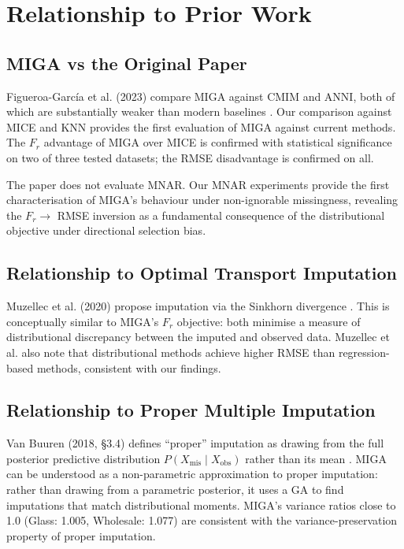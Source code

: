 \section{Relationship to Prior Work}

\subsection{MIGA vs the Original Paper}

Figueroa-Garc\'ia et al. (2023) compare MIGA against CMIM and ANNI, both of which are substantially weaker than modern baselines \cite{FigueroaGarcia2023}. Our comparison against MICE and KNN provides the first evaluation of MIGA against current methods. The $F_r$ advantage of MIGA over MICE is confirmed with statistical significance on two of three tested datasets; the RMSE disadvantage is confirmed on all.

The paper does not evaluate MNAR. Our MNAR experiments provide the first characterisation of MIGA's behaviour under non-ignorable missingness, revealing the $F_r \rightarrow$ RMSE inversion as a fundamental consequence of the distributional objective under directional selection bias.

\subsection{Relationship to Optimal Transport Imputation}

Muzellec et al. (2020) propose imputation via the Sinkhorn divergence \cite{Muzellec2020}. This is conceptually similar to MIGA's $F_r$ objective: both minimise a measure of distributional discrepancy between the imputed and observed data. Muzellec et al. also note that distributional methods achieve higher RMSE than regression-based methods, consistent with our findings.

\subsection{Relationship to Proper Multiple Imputation}

Van Buuren (2018, \S3.4) defines ``proper'' imputation as drawing from the full posterior predictive distribution $P(X_{\text{mis}} \mid X_{\text{obs}})$ rather than its mean \cite{vanBuuren2018}. MIGA can be understood as a non-parametric approximation to proper imputation: rather than drawing from a parametric posterior, it uses a GA to find imputations that match distributional moments. MIGA's variance ratios close to 1.0 (Glass: 1.005, Wholesale: 1.077) are consistent with the variance-preservation property of proper imputation.

